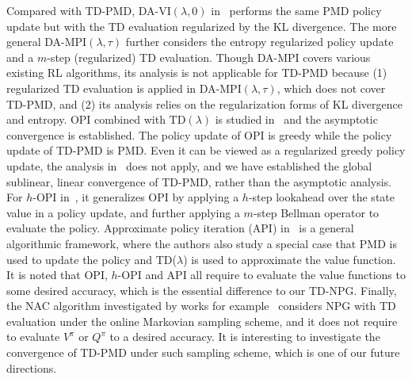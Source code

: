 \documentclass[10pt]{article}
\theoremstyle{plain}
\theoremstyle{definition}
\begin{document}
Compared with TD-PMD, DA-VI$(\lambda,0)$ in~\cite{vieillard2020leverage} performs the same PMD policy update but with the TD evaluation regularized by the KL divergence. The more general DA-MPI$(\lambda,\tau)$ further considers the entropy regularized policy update and a $m$-step (regularized) TD evaluation. Though DA-MPI covers various existing RL algorithms, its analysis is not applicable for TD-PMD because (1) regularized TD evaluation is applied in DA-MPI$(\lambda,\tau)$, which does not cover TD-PMD, and (2) its analysis relies on the regularization forms of KL divergence and entropy. OPI combined with $\text{TD}(\lambda)$ is studied in~\cite{tsitsiklis2002convergence} and the asymptotic convergence is established. The policy update of OPI is greedy while the policy update of TD-PMD is PMD. Even it can be viewed as a regularized greedy policy update, the analysis in~\cite{tsitsiklis2002convergence} does not apply, and we have established the global sublinear, linear convergence of TD-PMD, rather than the asymptotic analysis. For $h$-OPI in~\cite{winnicki2023convergence}, it generalizes OPI by applying a $h$-step lookahead over the state value in a policy update, and further applying a $m$-step Bellman operator to evaluate the policy. Approximate policy iteration (API) in~\cite{murthy2023performance} is a general algorithmic framework, where the authors also study a special case that PMD is used to update the policy and TD($\lambda$) is used to approximate the value function. It is noted that OPI, $h$-OPI and API all require to evaluate the value functions to some desired accuracy, which is the essential difference to our TD-NPG. Finally, the NAC algorithm investigated by works for example~\cite{khodadadian2022finite} considers NPG with TD evaluation under the online Markovian sampling scheme, and it does not require to evaluate $V^\pi$ or $Q^\pi$ to a desired accuracy. It is interesting to investigate the convergence of TD-PMD under such sampling scheme, which is one of our future directions. 
\end{document}
